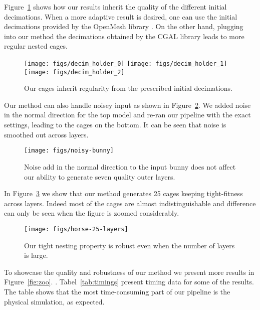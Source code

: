 Figure~\ref{fig:decimations} shows how our results inherit the quality
of the different initial decimations. When a more adaptive result is desired,
one can use the initial decimations provided by the OpenMesh library \cite{openmesh}. 
On the other hand, plugging into our method the decimations obtained by the CGAL
library \cite{cgal} leads to more regular nested cages.

\begin{figure}
  \texttt{[image: figs/decim\_holder\_0]}
    \texttt{[image: figs/decim\_holder\_1]}
      \texttt{[image: figs/decim\_holder\_2]}
  \caption{Our cages inherit regularity from the prescribed initial decimations. 
  }
  \label{fig:decimations}
\end{figure}

Our method can also handle noisey input as shown in Figure~\ref{fig:noisy-bunny}.
We added noise in the normal direction for the top model and 
re-ran our pipeline with the exact settings, leading to the cages on the bottom.
It can be seen that noise is smoothed out across layers. 

\begin{figure}
  \texttt{[image: figs/noisy-bunny]}
  \caption{Noise add in the normal direction to the input bunny does not
  affect our ability to generate seven quality outer layers.}
  \label{fig:noisy-bunny}
\end{figure}

In Figure~\ref{fig:horse-25-layers} we show that our method generates
25 cages keeping tight-fitness across layers. Indeed most of the cages
are almost indistinguishable and difference can only be seen when
the figure is zoomed considerably. 

\begin{figure}
  \texttt{[image: figs/horse-25-layers]}
  \caption{Our tight nesting property is robust even when the number of layers
  is large.}
  \label{fig:horse-25-layers}
\end{figure}

To showcase the quality and robustness of our method we present more results 
in Figure~\ref{fig:zoo}. .
Tabel~\ref{tab:timings} present timing data for some of the results. The table shows
that the most time-consuming part of our pipeline is the physical simulation, as expected.

